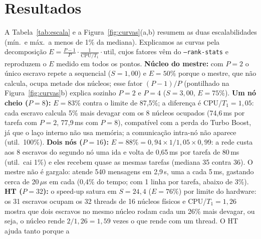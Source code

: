 \documentclass[10pt,twocolumn,a4paper]{article}
\newcommand{\code}[1]{\texttt{#1}}
\begin{document}
\section{Resultados}
\begin{table}[t]
\centering\scriptsize
{}
\caption{Forte (entrada de referência; $T_1=40{,}41$\,s, mín.\ 40,35, máx.\ 40,42) e fraca
(\code{height}~$=2160P$), 10 execuções por linha: $T_P$ (mediana, mín., máx.), $S=T_1/T_P$, $E=S/P$,
$E_\text{fraca}=T_1/T_P$; CPU/$T_1$ = tempo ocupado total dos escravos sobre $T_1$ (lentidão do cálculo
por núcleo); cauda = do primeiro escravo liberado ao fim; iter./iter.$_1$ = trabalho relativo à entrada
de referência; equiv.\ = checksum e iterações iguais aos da sequencial com a mesma entrada.
``64 (polling)'': sem \code{yield\_when\_idle}.}
\label{tab:escala}
\end{table}
A Tabela~\ref{tab:escala} e a Figura~\ref{fig:curvas}(a,b) resumem as duas escalabilidades
(mín.\ e máx.\ a menos de 1\% da mediana). Explicamos as curvas pela decomposição
$E = \frac{P-1}{P}\cdot\frac{1}{\mathrm{CPU}/T_1}\cdot\mathrm{util}$, cujos fatores vêm do
\code{--rank-stats} e reproduzem o $E$ medido em todos os pontos. \textbf{Núcleo do mestre:} com
$P=2$ o único escravo repete a sequencial ($S=1{,}00$) e $E=50\%$ porque o mestre, que não calcula,
ocupa metade dos núcleos; esse fator $(P-1)/P$ (pontilhado na Figura~\ref{fig:curvas}b) explica
sozinho $P=2$ e $P=4$ ($S=3{,}00$, $E=75\%$). \textbf{Um nó cheio ($P=8$):} $E=83\%$ contra o
limite de 87,5\%; a diferença é CPU/$T_1=1{,}05$: cada escravo calcula 5\% mais devagar com os 8
núcleos ocupados (74,6\,ms por tarefa com $P=2$, 77,9\,ms com $P=8$), compatível com a perda do
Turbo Boost, já que o laço interno não usa memória; a comunicação intra-nó não aparece (util.\
100\%). \textbf{Dois nós ($P=16$):} $E=88\% = 0{,}94\times1/1{,}05\times0{,}99$: a rede custa aos
8 escravos do segundo nó uma ida e volta de 0,65\,ms por tarefa de 80\,ms (util.\ cai 1\%) e eles
recebem quase as mesmas tarefas (mediana 35 contra 36). O mestre não é gargalo: atende 540
mensagens em 2,9\,s, uma a cada 5\,ms, gastando cerca de 20\,$\mu$s em cada (0,4\% do tempo; com 1
linha por tarefa, abaixo de 3\%). \textbf{HT ($P=32$):} o speed-up satura em $S=24{,}4$
($E=76\%$) por limite do hardware: os 31 escravos ocupam os 32 threads de 16 núcleos físicos e
CPU/$T_1=1{,}26$ mostra que dois escravos no mesmo núcleo rodam cada um 26\% mais devagar, ou seja,
o núcleo rende $2/1{,}26=1{,}59$ vezes o que rende com um thread. O HT ajuda tanto porque a
\end{document}
